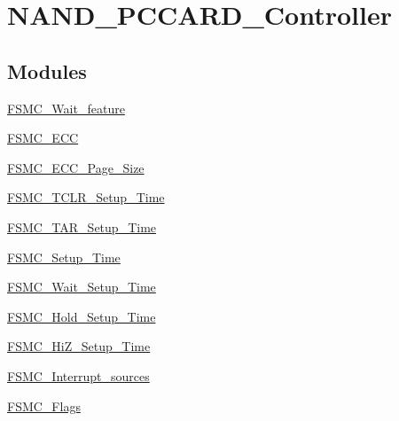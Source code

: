 \hypertarget{group__NAND__PCCARD__Controller}{
\section{NAND\_\-PCCARD\_\-Controller}
\label{group__NAND__PCCARD__Controller}
}
\subsection*{Modules}
\begin{DoxyCompactItemize}
\item 
\hyperlink{group__FSMC__Wait__feature}{FSMC\_\-Wait\_\-feature}
\item 
\hyperlink{group__FSMC__ECC}{FSMC\_\-ECC}
\item 
\hyperlink{group__FSMC__ECC__Page__Size}{FSMC\_\-ECC\_\-Page\_\-Size}
\item 
\hyperlink{group__FSMC__TCLR__Setup__Time}{FSMC\_\-TCLR\_\-Setup\_\-Time}
\item 
\hyperlink{group__FSMC__TAR__Setup__Time}{FSMC\_\-TAR\_\-Setup\_\-Time}
\item 
\hyperlink{group__FSMC__Setup__Time}{FSMC\_\-Setup\_\-Time}
\item 
\hyperlink{group__FSMC__Wait__Setup__Time}{FSMC\_\-Wait\_\-Setup\_\-Time}
\item 
\hyperlink{group__FSMC__Hold__Setup__Time}{FSMC\_\-Hold\_\-Setup\_\-Time}
\item 
\hyperlink{group__FSMC__HiZ__Setup__Time}{FSMC\_\-HiZ\_\-Setup\_\-Time}
\item 
\hyperlink{group__FSMC__Interrupt__sources}{FSMC\_\-Interrupt\_\-sources}
\item 
\hyperlink{group__FSMC__Flags}{FSMC\_\-Flags}
\end{DoxyCompactItemize}
